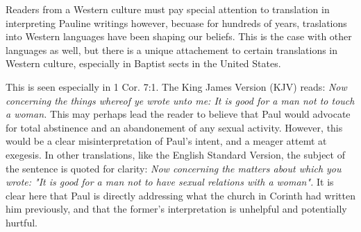 \documentclass{article}
\begin{document}
    \par Readers from a Western culture must pay special attention to
        translation in interpreting Pauline writings however, becuase for
        hundreds of years, traslations into Western languages have been shaping
        our beliefs. This is the case with other languages as well, but there
        is a unique attachement to certain translations in Western culture,
        especially in Baptist sects in the United States. \\

    \par This is seen especially in 1 Cor. 7:1. The King James Version (KJV)
        reads: \textit{Now concerning the things whereof ye wrote unto me: 
        It is good for a man not to touch a woman.} This may perhaps lead
        the reader to believe that Paul would advocate for total abstinence
        and an abandonement of any sexual activity. However, this would be
        a clear misinterpretation of Paul's intent, and a meager attemt at
        exegesis. In other translations, like the English Standard Version,
        the subject of the sentence is quoted for clarity: \textit{Now
        concerning the matters about which you wrote: "It is good for a
        man not to have sexual relations with a woman".} It is clear here
        that Paul is directly addressing what the church in Corinth had
        written him previously\cite{kjv_sex}, and that the former's
        interpretation is unhelpful and potentially hurtful. \\
\end{document}
